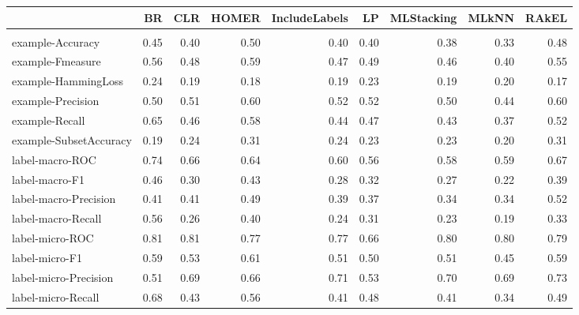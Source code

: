\documentclass{acm_proc_article-sp}
\begin{document}
\begin{table}
\centering
\begin{tabular}{l|rrrrrrrr}

  & BR & CLR & HOMER & IncludeLabels & LP & MLStacking & MLkNN & RAkEL \\

\hline \\

example-Accuracy & 0.45 & 0.40 & 0.50 & 0.40 & 0.40 & 0.38 & 0.33 & 0.48 \\

example-Fmeasure & 0.56 & 0.48 & 0.59 & 0.47 & 0.49 & 0.46 & 0.40 & 0.55 \\

example-HammingLoss & 0.24 & 0.19 & 0.18 & 0.19 & 0.23 & 0.19 & 0.20 & 0.17 \\

example-Precision & 0.50 & 0.51 & 0.60 & 0.52 & 0.52 & 0.50 & 0.44 & 0.60 \\

example-Recall & 0.65 & 0.46 & 0.58 & 0.44 & 0.47 & 0.43 & 0.37 & 0.52 \\

example-SubsetAccuracy & 0.19 & 0.24 & 0.31 & 0.24 & 0.23 & 0.23 & 0.20 & 0.31 \\

label-macro-ROC & 0.74 & 0.66 & 0.64 & 0.60 & 0.56 & 0.58 & 0.59 & 0.67 \\

label-macro-F1 & 0.46 & 0.30 & 0.43 & 0.28 & 0.32 & 0.27 & 0.22 & 0.39 \\

label-macro-Precision & 0.41 & 0.41 & 0.49 & 0.39 & 0.37 & 0.34 & 0.34 & 0.52 \\

label-macro-Recall & 0.56 & 0.26 & 0.40 & 0.24 & 0.31 & 0.23 & 0.19 & 0.33 \\

label-micro-ROC & 0.81 & 0.81 & 0.77 & 0.77 & 0.66 & 0.80 & 0.80 & 0.79 \\

label-micro-F1 & 0.59 & 0.53 & 0.61 & 0.51 & 0.50 & 0.51 & 0.45 & 0.59 \\

label-micro-Precision & 0.51 & 0.69 & 0.66 & 0.71 & 0.53 & 0.70 & 0.69 & 0.73 \\

label-micro-Recall & 0.68 & 0.43 & 0.56 & 0.41 & 0.48 & 0.41 & 0.34 & 0.49 \\


\end{tabular}
\end{table}
\end{document}
